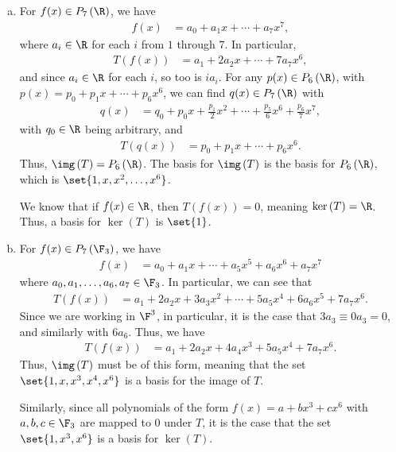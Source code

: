\documentclass[12pt]{mypackage}
\begin{document}
\begin{solution}\hfill
  \begin{enumerate}[(a)]
    \item For $f(x)\in P_{7}\left(\R\right)$, we have
      \begin{align*}
        f(x) &= a_0 + a_1x + \cdots + a_7x^{7},
      \end{align*}
      where $a_i\in \R$ for each $i$ from $1$ through $7$. In particular,
      \begin{align*}
        T\left(f(x)\right) &= a_1 + 2a_2x + \cdots + 7a_7x^{6},
      \end{align*}
      and since $a_{i}\in \R$ for each $i$, so too is $ia_{i}$. For any $p(x)\in P_{6}\left(\R\right)$, with $p(x) = p_0 + p_1x + \cdots + p_{6}x^{6}$, we can find $q(x)\in P_{7}\left(\R\right)$ with
      \begin{align*}
        q(x) &= q_0 + p_0x + \frac{p_1}{2}x^2 + \cdots + \frac{p_5}{6}x^{6} + \frac{p_6}{7}x^{7},
      \end{align*}
      with $q_0\in \R$ being arbitrary, and
      \begin{align*}
        T\left(q(x)\right) &= p_0 + p_1 x + \cdots + p_6x^{6}.
      \end{align*}
      Thus, $\img\left(T\right) = P_6\left(\R\right)$. The basis for $\img\left(T\right)$ is the basis for $P_{6}\left(\R\right)$, which is $\set{1,x,x^2,\dots,x^{6}}$.\newline

      We know that if $f(x)\in \R$, then $T\left(f(x)\right) = 0$, meaning $\ker\left(T\right) = \R$. Thus, a basis for $\ker\left(T\right)$ is $\set{1}$.
    \item For $f(x) \in P_{7}\left(\F_3\right)$, we have
      \begin{align*}
        f(x) &= a_0 + a_1 x + \cdots + a_{5}x^{5} + a_6x^{6} + a_7x^{7}
      \end{align*}
      where $a_0,a_1,\dots,a_6,a_7\in \F_3$. In particular, we can see that
      \begin{align*}
        T\left(f(x)\right) &= a_1 + 2a_2x + 3a_3x^2 + \cdots + 5a_5x^4 + 6a_6x^5 + 7a_7x^{6}.
      \end{align*}
      Since we are working in $\F^{3}$, in particular, it is the case that $3a_3 \equiv 0a_3 = 0$, and similarly with $6a_6$. Thus, we have
      \begin{align*}
        T\left(f(x)\right) &= a_1 + 2a_2x + 4a_4x^3 + 5a_5x^4 + 7a_7x^6.
      \end{align*}
      Thus, $\img\left(T\right)$ must be of this form, meaning that the set $\set{1,x,x^3,x^4,x^6}$ is a basis for the image of $T$.\newline

      Similarly, since all polynomials of the form $f(x) = a + bx^3 + cx^6$ with $a,b,c\in \F_3$ are mapped to $0$ under $T$, it is the case that the set $\set{1,x^3,x^6}$ is a basis for $\ker\left(T\right)$.
  \end{enumerate}
\end{solution}
\end{document}
